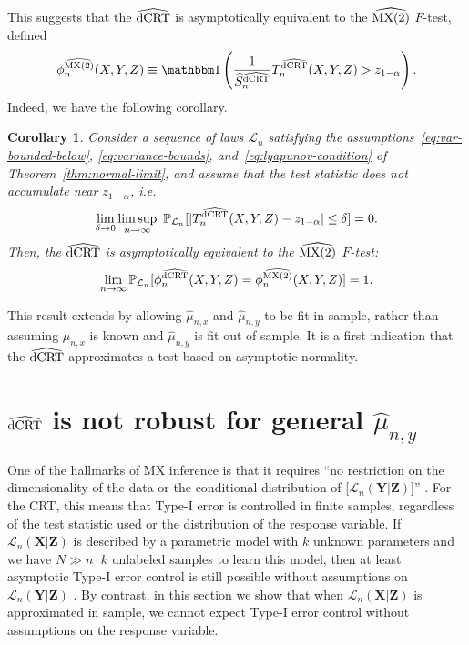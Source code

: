 \documentclass[aos]{imsart}
\theoremstyle{plain}
\newtheorem{corollary}{Corollary}
\theoremstyle{remark}
\renewcommand{\P}{\mathbb{P}}							%
\newcommand{\indicator}{\mathbbm 1}						%
\newcommand{\prx}{\bm X}								%
\newcommand{\srx}{X}									%
\newcommand{\prz}{\bm Z}								%
\newcommand{\srz}{Z}									%
\newcommand{\pry}{{\bm Y}}								%
\newcommand{\sry}{Y}									%
\newcommand{\law}{\mathcal L}							%
\newcommand{\dCRThat}{\widehat{\textnormal{dCRT}}}		%
\newcommand{\MXtwohat}{\widehat{\textnormal{MX(2)}}}		%
\begin{document}
This suggests that the $\dCRThat$ is asymptotically equivalent to the $\MXtwohat$ $F$-test, defined
\begin{equation}
    \phi_n^{\MXtwohat}(\srx,\sry,\srz) \equiv \indicator\left(\frac{1}{\widehat S_{n}^{\dCRThat}}T_n^{\dCRThat}(\srx, \sry, \srz) > z_{1-\alpha}\right).
    \label{eq:mx-2-f-test}
\end{equation}
Indeed, we have the following corollary.

\begin{corollary} \label{cor:asymptotic-equivalence} 
    Consider a sequence of laws $\law_n$ satisfying the assumptions~\eqref{eq:var-bounded-below}, \eqref{eq:variance-bounds}, and~\eqref{eq:lyapunov-condition} of Theorem~\ref{thm:normal-limit}, and assume that the test statistic does not accumulate near $z_{1-\alpha}$, i.e.
    \begin{equation}
        \lim_{\delta \rightarrow 0}\limsup_{n \rightarrow \infty}\ \P_{\law_n}[|T_n^{\dCRThat}(\srx, \sry, \srz)-z_{1-\alpha}| \leq \delta] = 0.
        \label{eq:non-accumulation}
    \end{equation}
    Then, the $\dCRThat$ is asymptotically equivalent to the $\MXtwohat$ $F$-test:
    \begin{equation}
        \lim_{n \rightarrow \infty}\P_{\law_n}[\phi_n^{\dCRThat}(\srx, \sry, \srz) = \phi_n^{\MXtwohat}(\srx, \sry, \srz)] = 1.
    \end{equation}
    
\end{corollary}

This result extends \citet[Theorem 2]{Katsevich2020a} by allowing $\widehat \mu_{n,x}$ and $\widehat \mu_{n,y}$ to be fit in sample, rather than assuming $\mu_{n,x}$ is known and $\widehat \mu_{n,y}$ is fit out of sample. It is a first indication that the $\dCRThat$ approximates a test based on asymptotic normality.

\section{$\dCRThat$ is not robust for general $\widehat \mu_{n,y}$} \label{sec:neg-results}
	
One of the hallmarks of MX inference is that it requires ``no restriction on the dimensionality of the data or the conditional distribution of [$\law_n(\pry|\prz)$]'' \citep{CetL16}. For the CRT, this means that Type-I error is controlled in finite samples, regardless of the test statistic used or the distribution of the response variable. If $\law_n(\prx|\prz)$ is described by a parametric model with $k$ unknown parameters and we have $N \gg n \cdot k$ unlabeled samples to learn this model, then at least asymptotic Type-I error control is still possible without assumptions on $\law_n(\pry|\prz)$ \citep{Berrett2019}. By contrast, in this section we show that when $\law_n(\prx|\prz)$ is approximated in sample, we cannot expect Type-I error control without assumptions on the response variable.
\end{document}
